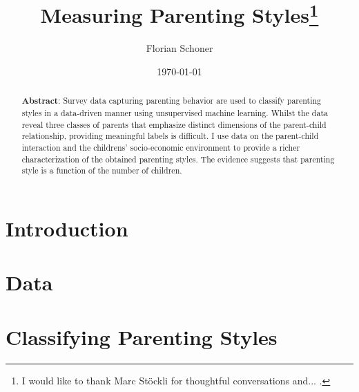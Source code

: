 \documentclass[a4paper,captions=tableheading,12pt]{scrartcl}
\title{Measuring Parenting Styles\thanks{I would like to thank Marc Stöckli for thoughtful conversations and... .}}
\author{
	\large Florian Schoner
}
\date{\large \today}
\begin{document}
	\maketitle
	\thispagestyle{empty}
	\begin{abstract}
		\noindent\textbf{Abstract}: Survey data capturing parenting behavior are used to classify parenting styles in a data-driven manner using unsupervised machine learning. Whilst the data reveal three classes of parents that emphasize distinct dimensions of the parent-child relationship, providing meaningful labels is difficult. I use data on the parent-child interaction and the childrens' socio-economic environment to provide a richer characterization of the obtained parenting styles. The evidence suggests that parenting style is a function of the number of children.
		\bigskip
	\end{abstract}
	\pagebreak
	
	\section{Introduction} \label{sec:intro}
	
	
	\section{Data} \label{sec:data}
	
	
	\section{Classifying Parenting Styles} \label{sec:classifying}
	
	
\end{document}
